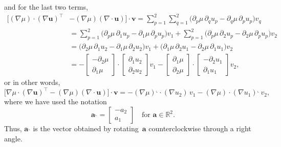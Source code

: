 \documentclass[a4paper,12pt]{article}
\newcommand{\bs}[1]{\boldsymbol{#1}}
\newcommand{\rot}{^\llcorner}
\begin{document}
and for the last two terms,
\begin{align*}
\bigl[(\nabla\mu)\cdot(\nabla\bs{u})^\top&-(\nabla\mu)(\nabla\cdot\bs{u})\bigr]
    \cdot\bs{v}
=\sum_{p=1}^2\sum_{q=1}^2\bigl(\partial_p\mu\,\partial_qu_p
    -\partial_q\mu\, \partial_pu_p\bigr)v_q\\
&=\sum_{p=1}^2
    \bigl(\partial_p\mu\,\partial_1u_p-\partial_1\mu\,\partial_pu_p\bigr)v_1
+\sum_{p=1}^2
    \bigl(\partial_p\mu\,\partial_2u_p-\partial_2\mu\,\partial_pu_p\bigr)v_2\\
&=\bigl(\partial_2\mu\,\partial_1u_2-\partial_1\mu\,\partial_2u_2\bigr)v_1
+\bigl(\partial_1\mu\,\partial_2u_1-\partial_2\mu\,\partial_1u_1\bigr)v_2\\
&=-\begin{bmatrix}-\partial_2\mu\\ \partial_1\mu\end{bmatrix}\cdot
\begin{bmatrix}\partial_1u_2\\ \partial_2u_2 \end{bmatrix}v_1
-\begin{bmatrix}\partial_1\mu\\ \partial_2\mu \end{bmatrix}\cdot
\begin{bmatrix}-\partial_2u_1\\ \partial_1u_1 \end{bmatrix}v_2,
\end{align*}
or in other words,
\[
\bigl[\nabla\mu\cdot(\nabla\bs{u})^\top-(\nabla\mu)(\nabla\cdot\bs{u})\bigr]
    \cdot\bs{v}
=-(\nabla\mu)\rot\cdot(\nabla u_2)\,v_1
    -(\nabla\mu)\cdot(\nabla u_1)\rot\,v_2,
\]
where we have used the notation
\[
\bs{a}\rot=\begin{bmatrix}-a_2\\ a_1 \end{bmatrix}
\quad\text{for $\bs{a}\in\mathbb{R}^2$.}
\]
Thus, $\bs{a}\rot$ is the vector obtained by rotating~$\bs{a}$
counterclockwise through a right angle.
\end{document}
